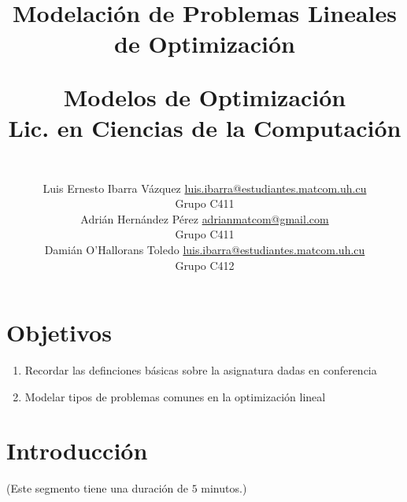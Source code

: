 \documentclass[a4paper,10pt,twocolumn]{article}
\title{Modelación de Problemas Lineales de Optimización\\
\vspace{2ex}
\begin{large}
Modelos de Optimización\\
Lic. en Ciencias de la Computación
\end{large}}
\author{\\
\name Luis Ernesto Ibarra Vázquez \email \href{mailto:luis.ibarra@estudiantes.matcom.uh.cu}{luis.ibarra@estudiantes.matcom.uh.cu}
	\\ \addr Grupo C411 \\
\name Adrián Hernández Pérez \email \href{mailto:adrianmatcom@gmail.com}{adrianmatcom@gmail.com}
	\\ \addr Grupo C411 \\
\name Damián O'Hallorans Toledo \email \href{mailto:luis.ibarra@estudiantes.matcom.uh.cu}{luis.ibarra@estudiantes.matcom.uh.cu}
	\\ \addr Grupo C412} %
\theoremstyle{theorem}
\theoremstyle{definition}
\theoremstyle{remark}
\begin{document}

\section{Objetivos}
\begin{enumerate}
	\item Recordar las definciones básicas sobre la asignatura dadas en conferencia
	\item Modelar tipos de problemas comunes en la optimización lineal
\end{enumerate}


\section{Introducción}\label{sec:intro}
(Este segmento tiene una duración de $5$ minutos.)\\
\end{document}
